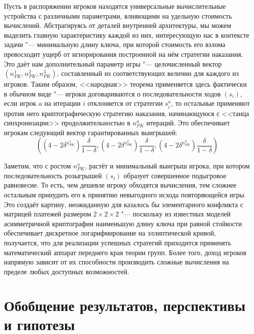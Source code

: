 Пусть в распоряжении игроков находятся универсальные вычислительные устройства с различными параметрами, влияющими на удельную стоимость вычислений. Абстрагируясь от деталей внутренней архитектуры, мы можем выделить главную характеристику каждой из них, интересующую нас в контексте задачи "--- минимальную длину ключа, при которой стоимость его взлома превосходит ущерб от игнорирования построенной на нём стратегии наказания. Это даёт нам дополнительный параметр игры "--- целочисленный вектор $(n_{PK}^1, n_{PK}^2, n_{PK}^3)$, составленный из соответствующих величин для каждого из игроков. Таким образом, <<народная>> теорема применяется здесь фактически в обычном виде "--- игроки договариваются о последовательности ходов $(s_i)$, если игрок $a$ на итерации $i$ отклоняется от стратегии $s^a_i$, то остальные применяют против него криптографическую стратегию наказания, начинающуюся с <<танца синхронизации>> продолжительностью в $n_{PK}^a$ итераций. Это обеспечивает игрокам следующий вектор гарантированных выигрышей:
\begin{equation*}
	((4 - 2 \delta^{n_{PK}^1}) \frac{\delta}{1-\delta}, (4 - 2 \delta^{n_{PK}^2}) \frac{\delta}{1-\delta}, (4 - 2 \delta^{n_{PK}^3}) \frac{\delta}{1-\delta})
\end{equation*}

Заметим, что с ростом $n_{PK}^a$, растёт и минимальный выигрыш игрока, при котором последовательность розыгрышей $(s_i)$ образует совершенное подыгровое равновесие. То есть, чем дешевле игроку обходятся вычисления, тем сложнее остальным принудить его к принятию невыгодного исхода повторяющейся игры. Это создаёт картину, неожиданную для казалось бы элементарного конфликта с матрицей платежей размером $2 \times 2 \times 2$ "--- поскольку из известных моделей асимметричной криптографии наименьшую длину ключа при равной стойкости обеспечивает дискретное логарифмирование на эллиптической кривой, получается, что для реализации успешных стратегий приходится применять математический аппарат переднего края теории групп. Более того, доход игроков напрямую зависит от их способности производить сложные вычисления на пределе любых доступных возможностей.

\section{Обобщение результатов, перспективы и гипотезы}\label{sec:ch3/sect4}

